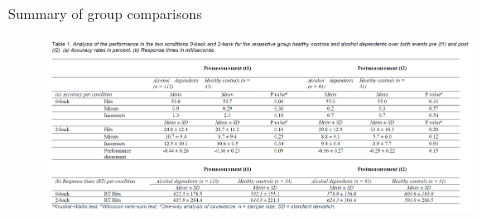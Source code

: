 \documentclass{bredelebeamer}
\begin{document}
\begin{frame}{Summary of group comparisons}
\begin{figure}
     \includegraphics[scale=0.40]{images/Table_BehavRes.PNG}
\end{figure}
\end{frame}






\end{document}
